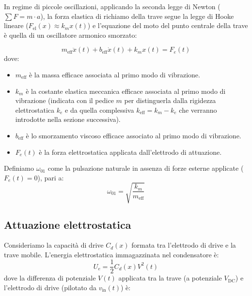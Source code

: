 \documentclass[11pt,a4paper]{article}
\begin{document}


\noindent In regime di piccole oscillazioni, applicando la seconda legge di Newton ($\sum F = m \cdot a$), la forza elastica di richiamo della trave segue la legge di Hooke lineare ($F_{\text{el}}(x) \approx k_m x(t)$) e l'equazione del moto del punto centrale della trave è quella di un oscillatore armonico smorzato:

\begin{equation}
    \label{eq:meccanica_1dof}
    m_{\text{eff}} \ddot{x}(t) + b_{\text{eff}} \dot{x}(t) + k_m x(t) = F_e(t)
\end{equation}
dove:
\begin{itemize}
    \item $m_{\text{eff}}$ è la massa efficace associata al primo modo di vibrazione.
    \item $k_m$ è la costante elastica meccanica efficace associata al primo modo di vibrazione (indicata con il pedice $m$ per distinguerla dalla rigidezza elettrostatica $k_e$ e da quella complessiva $k_{\text{eff}} = k_m - k_e$ che verranno introdotte nella sezione successiva).
    \item $b_{\text{eff}}$ è lo smorzamento viscoso efficace associato al primo modo di vibrazione.
    \item $F_e(t)$ è la forza elettrostatica applicata dall'elettrodo di attuazione.
\end{itemize}
\noindent Definiamo $\omega_{01}$ come la pulsazione naturale in assenza di forze esterne applicate ($F_e(t) = 0$), pari a:
    \begin{equation}
        \omega_{01} = \sqrt{\frac{k_m}{m_{\text{eff}}}}
    \end{equation}

\newpage

\subsection{Attuazione elettrostatica}
\label{sec:forze_elettrostatiche}

Consideriamo la capacità di drive $C_d(x)$ formata tra l'elettrodo di drive e la trave mobile. L'energia elettrostatica immagazzinata nel condensatore è:
\begin{equation}
    U_e = \frac{1}{2} C_d(x) V^2(t)
\end{equation}
dove la differenza di potenziale $V(t)$ applicata tra la trave (a potenziale $V_{\text{DC}}$) e l'elettrodo di drive (pilotato da $v_{\text{in}}(t)$) è:
\end{document}
